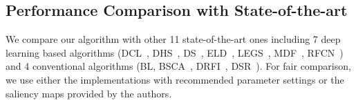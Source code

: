 \documentclass[10pt,twocolumn,letterpaper]{article}
\begin{document}
\subsection{Performance Comparison with State-of-the-art}
We compare our algorithm with other 11 state-of-the-art ones including 7 deep learning based algorithms (DCL~\cite{LiYu16}, DHS~\cite{liu2016dhsnet}, DS~\cite{Li2016DeepSaliency}, ELD~\cite{lee2016deep}, LEGS~\cite{wang2015deep}, MDF~\cite{zhao2015saliency}, RFCN~\cite{wang2016saliency})
and 4 conventional algorithms (BL\cite{tong2015bootstrap}, BSCA~\cite{qin2015saliency}, DRFI~\cite{jiang2013salient}, DSR~\cite{li2013saliency}).
%
For fair comparison, we use either the implementations with recommended parameter settings or the saliency maps provided by the authors.
\setlength{\tabcolsep}{2.95pt}
\end{document}
